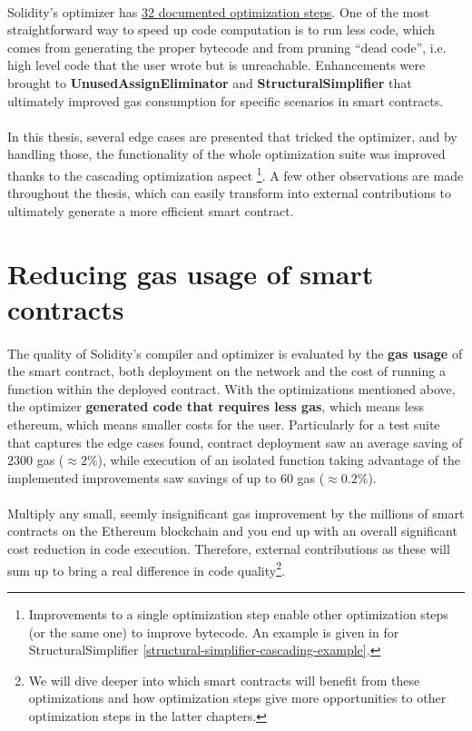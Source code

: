 \paragraph*{}
Solidity's optimizer has \href{https://docs.soliditylang.org/en/v0.8.14/internals/optimizer.html#optimizer-steps}{32 documented optimization steps}. One of the most straightforward way to speed up code computation is to run less code, which comes from generating the proper bytecode and from pruning ``dead code'', i.e. high level code that the user wrote but is unreachable. Enhancements were brought to \textbf{UnusedAssignEliminator} and \textbf{StructuralSimplifier} that ultimately improved gas consumption for specific scenarios in smart contracts.

\paragraph*{}
In this thesis, several edge cases are presented that tricked the optimizer, and by handling those, the functionality of the whole optimization suite was improved thanks to the cascading optimization aspect \footnote{Improvements to a single optimization step enable other optimization steps (or the same one) to improve bytecode. An example is given in for StructuralSimplifier \ref{structural-simplifier-cascading-example}.}. A few other observations are made throughout the thesis, which can easily transform into external contributions to ultimately generate a more efficient smart contract.

\section{Reducing gas usage of smart contracts}
\paragraph*{}
The quality of Solidity's compiler and optimizer is evaluated by the \textbf{gas usage} of the smart contract, both deployment on the network and the cost of running a function within the deployed contract. With the optimizations mentioned above, the optimizer \textbf{generated code that requires less gas}, which means less ethereum, which means smaller costs for the user. Particularly for a test suite that captures the edge cases found, contract deployment saw an average saving of $2300$ gas ($\approx 2\%$), while execution of an isolated function taking advantage of the implemented improvements saw savings of up to $60$ gas ($\approx 0.2\%$).

\paragraph*{}
Multiply any small, seemly insignificant gas improvement by the millions of smart contracts on the Ethereum blockchain and you end up with an overall significant cost reduction in code execution. Therefore, external contributions as these will sum up to bring a real difference in code quality\footnote{We will dive deeper into which smart contracts will benefit from these optimizations and how optimization steps give more opportunities to other optimization steps in the latter chapters.}.
